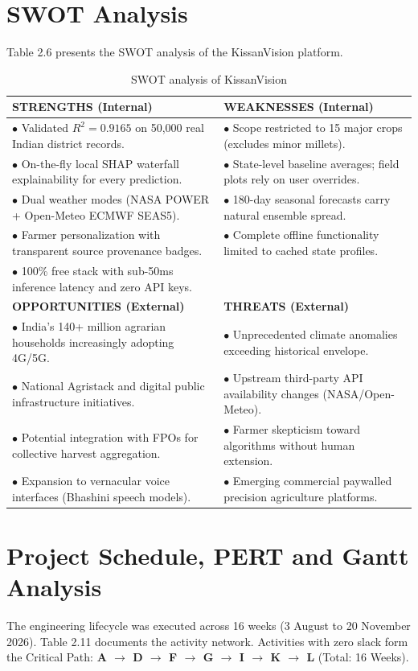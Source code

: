 \documentclass[11pt,a4paper]{report}
\begin{document}
\section{SWOT Analysis}
Table 2.6 presents the SWOT analysis of the KissanVision platform.

\begin{table}[htbp]
\centering
\small
\caption{SWOT analysis of KissanVision}
\begin{tabularx}{\textwidth}{XX}
\toprule
\textbf{STRENGTHS (Internal)} & \textbf{WEAKNESSES (Internal)} \\
\midrule
$\bullet$ Validated $R^2 = 0.9165$ on 50,000 real Indian district records. & $\bullet$ Scope restricted to 15 major crops (excludes minor millets). \\
$\bullet$ On-the-fly local SHAP waterfall explainability for every prediction. & $\bullet$ State-level baseline averages; field plots rely on user overrides. \\
$\bullet$ Dual weather modes (NASA POWER + Open-Meteo ECMWF SEAS5). & $\bullet$ 180-day seasonal forecasts carry natural ensemble spread. \\
$\bullet$ Farmer personalization with transparent source provenance badges. & $\bullet$ Complete offline functionality limited to cached state profiles. \\
$\bullet$ 100\% free stack with sub-50ms inference latency and zero API keys. & \\
\midrule
\textbf{OPPORTUNITIES (External)} & \textbf{THREATS (External)} \\
\midrule
$\bullet$ India's 140+ million agrarian households increasingly adopting 4G/5G. & $\bullet$ Unprecedented climate anomalies exceeding historical envelope. \\
$\bullet$ National Agristack and digital public infrastructure initiatives. & $\bullet$ Upstream third-party API availability changes (NASA/Open-Meteo). \\
$\bullet$ Potential integration with FPOs for collective harvest aggregation. & $\bullet$ Farmer skepticism toward algorithms without human extension. \\
$\bullet$ Expansion to vernacular voice interfaces (Bhashini speech models). & $\bullet$ Emerging commercial paywalled precision agriculture platforms. \\
\bottomrule
\end{tabularx}
\end{table}

\section{Project Schedule, PERT and Gantt Analysis}
The engineering lifecycle was executed across 16 weeks (3 August to 20 November 2026). Table 2.11 documents the activity network. Activities with zero slack form the Critical Path: \textbf{A $\rightarrow$ D $\rightarrow$ F $\rightarrow$ G $\rightarrow$ I $\rightarrow$ K $\rightarrow$ L} (Total: 16 Weeks).
\end{document}
